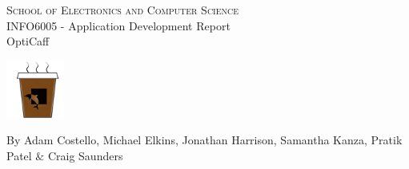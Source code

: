 
\begin{titlepage}
	
\begin{center}

\textsc{\huge{School of Electronics and Computer Science}}\\[2cm]

\huge{INFO6005 - Application Development Report}\\[5cm]

\LARGE{OptiCaff}

\begin{center}
\includegraphics[trim = 0mm 0mm 0mm 0mm, clip, scale=1.5]{images/ic_launcher.png}
\end{center}

\vfill 

\LARGE{By Adam Costello, Michael Elkins, Jonathan Harrison, Samantha Kanza, Pratik Patel $\&$ Craig Saunders}

\end{center}

\end{titlepage}
